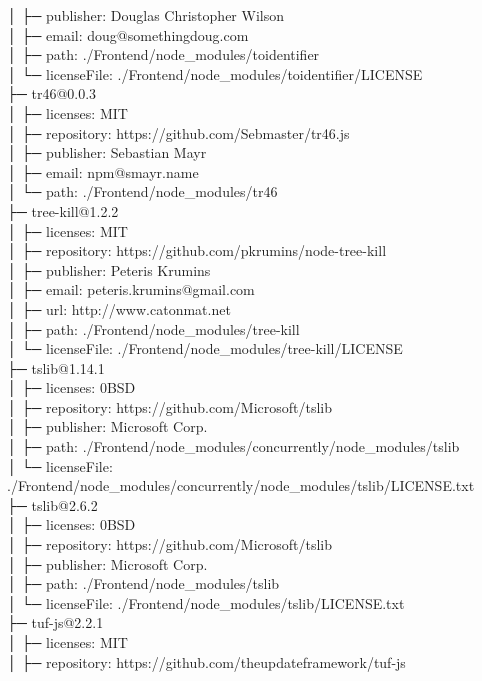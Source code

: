 │  ├─ publisher: Douglas Christopher Wilson\\
│  ├─ email: doug@somethingdoug.com\\
│  ├─ path: ./Frontend/node\_modules/toidentifier\\
│  └─ licenseFile: ./Frontend/node\_modules/toidentifier/LICENSE\\
├─ tr46@0.0.3\\
│  ├─ licenses: MIT\\
│  ├─ repository: https://github.com/Sebmaster/tr46.js\\
│  ├─ publisher: Sebastian Mayr\\
│  ├─ email: npm@smayr.name\\
│  └─ path: ./Frontend/node\_modules/tr46\\
├─ tree-kill@1.2.2\\
│  ├─ licenses: MIT\\
│  ├─ repository: https://github.com/pkrumins/node-tree-kill\\
│  ├─ publisher: Peteris Krumins\\
│  ├─ email: peteris.krumins@gmail.com\\
│  ├─ url: http://www.catonmat.net\\
│  ├─ path: ./Frontend/node\_modules/tree-kill\\
│  └─ licenseFile: ./Frontend/node\_modules/tree-kill/LICENSE\\
├─ tslib@1.14.1\\
│  ├─ licenses: 0BSD\\
│  ├─ repository: https://github.com/Microsoft/tslib\\
│  ├─ publisher: Microsoft Corp.\\
│  ├─ path: ./Frontend/node\_modules/concurrently/node\_modules/tslib\\
│  └─ licenseFile: ./Frontend/node\_modules/concurrently/node\_modules/tslib/LICENSE.txt\\
├─ tslib@2.6.2\\
│  ├─ licenses: 0BSD\\
│  ├─ repository: https://github.com/Microsoft/tslib\\
│  ├─ publisher: Microsoft Corp.\\
│  ├─ path: ./Frontend/node\_modules/tslib\\
│  └─ licenseFile: ./Frontend/node\_modules/tslib/LICENSE.txt\\
├─ tuf-js@2.2.1\\
│  ├─ licenses: MIT\\
│  ├─ repository: https://github.com/theupdateframework/tuf-js\\
